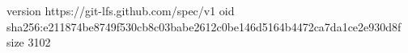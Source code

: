 version https://git-lfs.github.com/spec/v1
oid sha256:e211874be8749f530cb8c03babe2612c0be146d5164b4472ca7da1ce2e930d8f
size 3102
